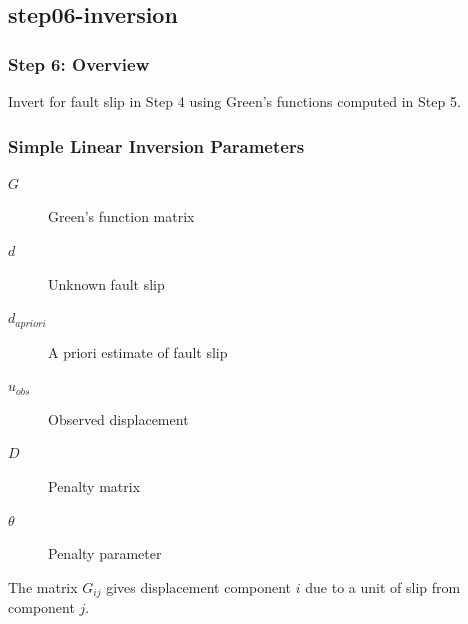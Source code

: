 \documentclass[aspectratio=169]{beamer}
\begin{document}
\subsection{step06-inversion}

\begin{frame}
  \frametitle{Step 6: Overview}
  \summary{}

  Invert for fault slip in Step 4 using Green's functions computed in Step 5.
      
\end{frame}


\begin{frame}
  \frametitle{Simple Linear Inversion Parameters}
  \summary{}

  \begin{description}
  \item[$G$] Green's function matrix
  \item[$d$] Unknown fault slip
  \item[$d_\mathit{apriori}$] A priori estimate of fault slip
  \item[$u_\mathit{obs}$] Observed displacement
  \item[$D$] Penalty matrix
  \item[$\theta$] Penalty parameter
  \end{description}
  
  \vfill
  The matrix $G_{ij}$ gives displacement component $i$ due to a unit of slip from component $j$.

\end{frame}
\end{document}
